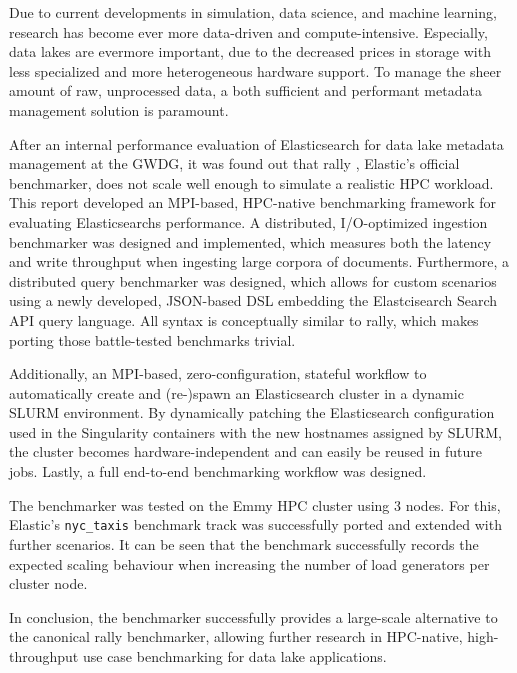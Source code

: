 Due to current developments in simulation, data science, and machine learning, research has become ever more data-driven and compute-intensive. Especially, data lakes are evermore important, due to the decreased prices in storage with less specialized and more heterogeneous hardware support. To manage the sheer amount of raw, unprocessed data, a both sufficient and performant metadata management solution is paramount.

After an internal performance evaluation of Elasticsearch for data lake metadata management at the GWDG, it was found out that rally \cite{rally}, Elastic's official benchmarker, does not scale well enough to simulate a realistic \ac{HPC} workload. This report developed an \acs{MPI}-based, \acs{HPC}-native benchmarking framework for evaluating Elasticsearchs performance. A distributed, I/O-optimized ingestion benchmarker was designed and implemented, which measures both the latency and write throughput when ingesting large corpora of documents. Furthermore, a distributed query benchmarker was designed, which allows for custom scenarios using a newly developed, \acs{JSON}-based \ac{DSL} embedding the Elastcisearch Search \acs{API} query language. All syntax is conceptually similar to rally, which makes porting those battle-tested benchmarks trivial.

Additionally, an \acs{MPI}-based, zero-configuration, stateful workflow to automatically create and (re-)spawn an Elasticsearch cluster in a dynamic \acs{SLURM} environment. By dynamically patching the Elasticsearch configuration used in the Singularity containers with the new hostnames assigned by SLURM, the cluster becomes hardware-independent and can easily be reused in future jobs. Lastly, a full end-to-end benchmarking workflow was designed.

The benchmarker was tested on the Emmy \acs{HPC} cluster using 3 nodes. For this, Elastic's \texttt{nyc\_taxis} benchmark track was successfully ported and extended with further scenarios. It can be seen that the benchmark successfully records the expected scaling behaviour when increasing the number of load generators per cluster node.

In conclusion, the benchmarker successfully provides a large-scale alternative to the canonical rally benchmarker, allowing further research in \ac{HPC}-native, high-throughput use case benchmarking for data lake applications.
